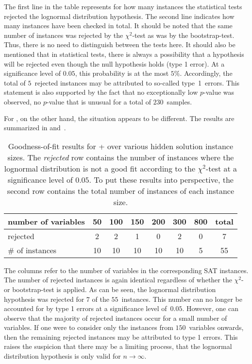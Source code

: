 The first line in the table represents for how many instances the statistical tests rejected the lognormal distribution hypothesis. The second line indicates how many instances have been checked in total. 
It should be noted that the same number of instances was rejected by the $\chi^2$-test as was by the bootstrap-test.
Thus,
there is no need to distinguish between the tests here. It should also be mentioned that in statistical tests, there is always a possibility that a hypothesis will be rejected even though the null hypothesis holds (type 1 error).
At a significance level of \mbox{$0.05$}, this probability is at the most $5\%$.
Accordingly, the total of $5$~rejected instances may be attributed to 
so-called
\mbox{type~1 errors}. This statement is also supported by the fact that no exceptionally low $p$-value was observed, \ie no $p$-value that is unusual for a total of $230$~samples.

For \probSAT{}, on the other hand, the situation appears to be different. The results are summarized in  and~\cite{AllData}.
\begin{table}[htb]
	\begin{tabular}{l| c c c c c c || c}
		number of variables & 50 & 100 & 150 & 200 & 300 & 800 & total \\\hline
		rejected & 2 & 2 & 1 & 0 & 2 & 0 & 7\\
		$\#$ of instances & 10 & 10 & 10 & 10 & 10 & 5 & 55
	\end{tabular}
	\caption{Goodness-of-fit results for \Alfa{}+\probSAT{} over various hidden solution instance sizes.
	The \emph{rejected} row contains the number of instances where the lognormal distribution is not a good fit according to the $\chi^2$-test at a significance level of $0.05$. To put these results into perspective, the second row contains the total number of instances of each instance size.}
	\label{tab:stat_probSAT}
\end{table}
The columns refer to the number of variables in the corresponding SAT instances.
The number of rejected instances is again identical regardless of whether the $\chi^2$- or bootstrap-test is applied. %
As can be seen, the lognormal distribution hypothesis was rejected for $7$ of the $55$~instances.
This number can no longer be accounted for by type 1 errors at a significance level of~$0.05$.
However, one can observe that the majority of rejected instances occur for a small number of variables.
If one were to consider only the instances from $150$~variables onwards, then the remaining rejected instances may be attributed to type 1 errors.
This raises the suspicion that there may be a limiting process, \ie that the lognormal distribution hypothesis is only valid for $n\rightarrow \infty$.

